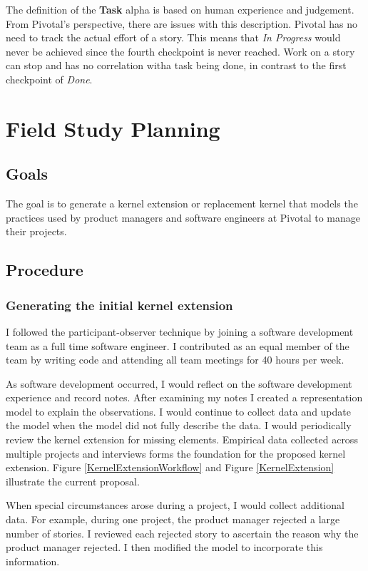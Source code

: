 \documentclass[preprint,12pt,3p]{elsarticle}
\begin{document}
The definition of the \textbf{Task} alpha is based on human experience and judgement. From Pivotal's perspective, there are issues with this description. Pivotal has no need to track the actual effort of a story. This means that \textit{In Progress} would never be achieved since the fourth checkpoint is never reached. Work on a story can stop and has no correlation witha task being done, in contrast to the first checkpoint of \textit{Done}. 

\section{Field Study Planning} 
\label{FieldStudyPlanning}

\subsection{Goals}
The goal is to generate a kernel extension or replacement kernel that models the practices used by product managers and software engineers at Pivotal to manage their projects.

\subsection{Procedure}
\subsubsection{Generating the initial kernel extension}
I followed the participant-observer technique by joining a software development team as a full time software engineer. I contributed as an equal member of the team by writing code and attending all team meetings for 40 hours per week. 

As software development occurred, I would reflect on the software development experience and record notes. After examining my notes I created a representation model to explain the observations. I would continue to collect data and update the model when the model did not fully describe the data. I would periodically review the kernel extension for missing elements. Empirical data collected across multiple projects and interviews forms the foundation for the proposed kernel extension. Figure \ref{KernelExtensionWorkflow} and Figure \ref{KernelExtension} illustrate the current proposal.

When special circumstances arose during a project, I would collect additional data. For example, during one project, the product manager rejected a large number of stories. I reviewed each rejected story to ascertain the reason why the product manager rejected. I then modified the model to incorporate this information.
\end{document}
